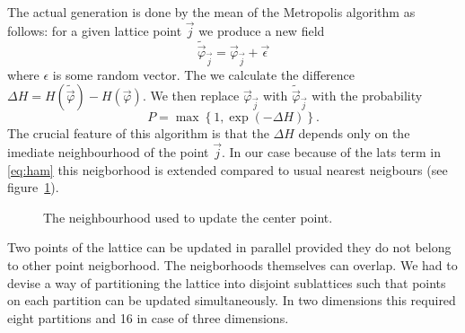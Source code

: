 \documentclass[a4paper]{llncs}
\newcommand{\vphi}{\vec{\varphi}}
\newcommand{\vj}{{\vec{j}}}
\begin{document}
The actual  generation is done by the mean of the Metropolis  algorithm as follows: for a given lattice point $\vj$ we produce a new field 
\begin{equation}
\widetilde{\vphi}_\vj=\vphi_\vj+\vec{\epsilon}
\end{equation}
where $\epsilon$ is some random vector. The we calculate the difference 
$\Delta H = H(\widetilde{\vphi})-H(\vphi)$.
We then replace $\vphi_\vj$ with $\widetilde{\vphi}_\vj$ with the probability
\begin{equation}
P=\max\left\{1,\exp(-\Delta H)\right\}.
\end{equation}
The crucial feature of this algorithm is that the $\Delta H$ depends
only on the imediate neighbourhood of the point $\vj$. In our case
because of the lats term in \eqref{eq:ham} this neigborhood is
extended compared to usual nearest neigbours (see figure~\ref{fig:nn}). 
\begin{figure}
\begin{center} 
\end{center}
\caption{\label{fig:nn}The neighbourhood used to update the center point.}
\end{figure}

Two points of the lattice can be updated in parallel provided they do
not belong to other point neigborhood. The neigborhoods themselves can
overlap. We had to devise a way of partitioning the lattice into disjoint sublattices such that points on each partition can be updated simultaneously. In two dimensions this required eight partitions and 16 in case of three dimensions. 
\end{document}
